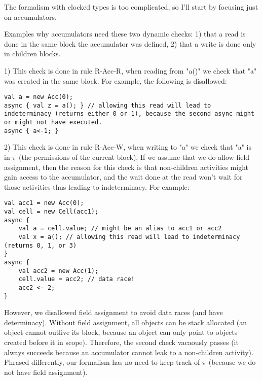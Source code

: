 The formalism with clocked types is too complicated, so I'll start by focusing just on accumulators.

Examples why accumulators need these two dynamic checks:
1) that a read is done in the same block the accumulator was defined,
2) that a write is done only in children blocks.

1) This check is done in rule R-Acc-R,
when reading from "a()" we check that "a" was created in the same block.
For example, the following is disallowed:
\begin{lstlisting}
val a = new Acc(0);
async { val z = a(); } // allowing this read will lead to indeterminacy (returns either 0 or 1), because the second async might or might not have executed.
async { a<-1; }
\end{lstlisting}

2) This check is done in rule R-Acc-W,
when writing to "a" we check that "a" is in $\pi$ (the permissions of the current block).
If we assume that we do allow field assignment,
then the reason for this check is that non-children activities might gain access to the accumulator,
and the wait done at the read won't wait for those activities thus leading to indeterminacy.
For example:
\begin{lstlisting}
val acc1 = new Acc(0);
val cell = new Cell(acc1);
async { 
	val a = cell.value; // might be an alias to acc1 or acc2
	val x = a(); // allowing this read will lead to indeterminacy (returns 0, 1, or 3)
}
async {
	val acc2 = new Acc(1);
	cell.value = acc2; // data race!
	acc2 <- 2;
}
\end{lstlisting}
However, we disallowed field assignment to avoid data races (and have determinacy).
Without field assignment, all objects can be stack allocated (an object cannot outlive its block, because an object can only point to objects created before it in scope).
Therefore, the second check vacaously passes (it always succeeds because an accumulator cannot leak to a non-children activity).
Phrased differently, our formalism has no need to keep track of $\pi$ (because we do not have field assignment).

